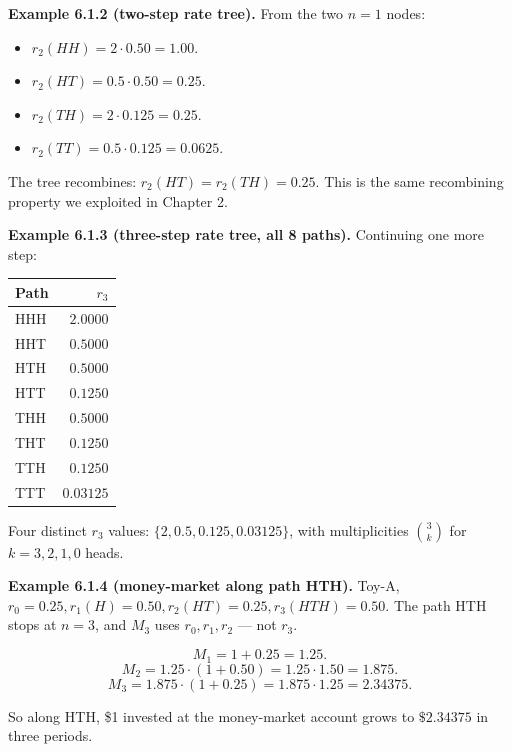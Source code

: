 \documentclass[
  10pt,
  twoside]{book}
\newcounter{none} %
\providecommand{\tightlist}{%
  \setlength{\itemsep}{0pt}\setlength{\parskip}{0pt}}
\begin{document}
\textbf{Example 6.1.2 (two-step rate tree).} From the two \(n=1\) nodes:

\begin{itemize}
\tightlist
\item
  \(r_2(HH) = 2 \cdot 0.50 = 1.00\).
\item
  \(r_2(HT) = 0.5 \cdot 0.50 = 0.25\).
\item
  \(r_2(TH) = 2 \cdot 0.125 = 0.25\).
\item
  \(r_2(TT) = 0.5 \cdot 0.125 = 0.0625\).
\end{itemize}

The tree recombines: \(r_2(HT) = r_2(TH) = 0.25\). This is the same
recombining property we exploited in Chapter 2.

\textbf{Example 6.1.3 (three-step rate tree, all 8 paths).} Continuing
one more step:

{\def\LTcaptype{none} %
\begin{table}[H]
\centering
\begin{tabular}{|l|r|}
\toprule
Path & \(r_3\) \\
\midrule



HHH & \(2.0000\) \\
HHT & \(0.5000\) \\
HTH & \(0.5000\) \\
HTT & \(0.1250\) \\
THH & \(0.5000\) \\
THT & \(0.1250\) \\
TTH & \(0.1250\) \\
TTT & \(0.03125\) \\
\bottomrule
\end{tabular}
\end{table}
}

Four distinct \(r_3\) values: \(\{2, 0.5, 0.125, 0.03125\}\), with
multiplicities \(\binom{3}{k}\) for \(k = 3, 2, 1, 0\) heads.

\textbf{Example 6.1.4 (money-market along path HTH).} Toy-A,
\(r_0 = 0.25, r_1(H) = 0.50, r_2(HT) = 0.25, r_3(HTH) = 0.50\). The path
HTH stops at \(n = 3\), and \(M_3\) uses \(r_0, r_1, r_2\) --- not
\(r_3\).

\[M_1 = 1 + 0.25 = 1.25.\]
\[M_2 = 1.25 \cdot (1 + 0.50) = 1.25 \cdot 1.50 = 1.875.\]
\[M_3 = 1.875 \cdot (1 + 0.25) = 1.875 \cdot 1.25 = 2.34375.\]

So along HTH, \$1 invested at the money-market account grows to
\(\$2.34375\) in three periods.
\end{document}
